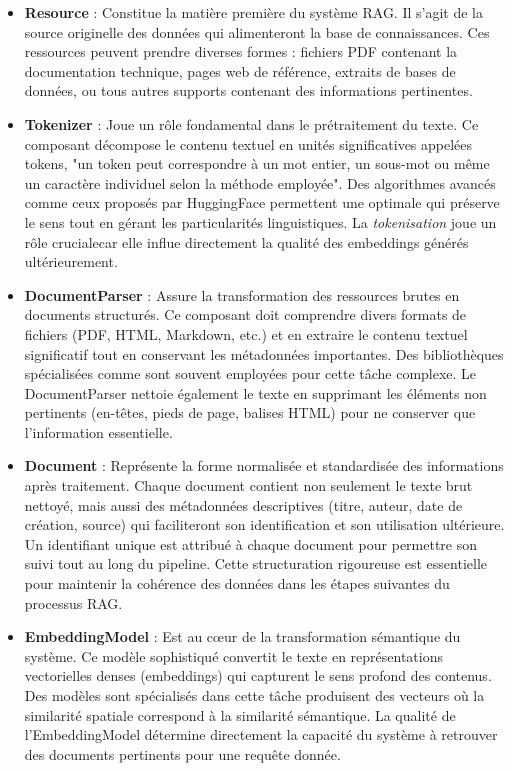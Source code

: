 \documentclass[12pt,a4paper]{report}
\begin{document}
	\begin{itemize}
		
		\item \textbf{Resource} : Constitue la matière première du système RAG. Il s'agit de la source originelle des données qui alimenteront la base de connaissances. Ces ressources peuvent prendre diverses formes : fichiers PDF contenant la documentation technique, pages web de référence, extraits de bases de données, ou tous autres supports contenant des informations pertinentes.
		
		\item \textbf{Tokenizer} : Joue un rôle fondamental dans le prétraitement du texte. Ce composant décompose le contenu textuel en unités significatives appelées tokens, "un token peut correspondre à un mot entier, un sous-mot ou même un caractère individuel selon la méthode employée". Des algorithmes avancés comme ceux proposés par HuggingFace permettent une  optimale qui préserve le sens tout en gérant les particularités linguistiques. La \textit{tokenisation} joue un rôle crucialecar elle influe directement la qualité des embeddings générés ultérieurement.
		
		\item \textbf{DocumentParser} : Assure la transformation des ressources brutes en documents structurés. Ce composant doit comprendre divers formats de fichiers (PDF, HTML, Markdown, etc.) et en extraire le contenu textuel significatif tout en conservant les métadonnées importantes. Des bibliothèques spécialisées comme sont souvent employées pour cette tâche complexe. Le DocumentParser nettoie également le texte en supprimant les éléments non pertinents (en-têtes, pieds de page, balises HTML) pour ne conserver que l'information essentielle.
		
		\item \textbf{Document} : Représente la forme normalisée et standardisée des informations après traitement. Chaque document contient non seulement le texte brut nettoyé, mais aussi des métadonnées descriptives (titre, auteur, date de création, source) qui faciliteront son identification et son utilisation ultérieure. Un identifiant unique est attribué à chaque document pour permettre son suivi tout au long du pipeline. Cette structuration rigoureuse est essentielle pour maintenir la cohérence des données dans les étapes suivantes du processus RAG.
		
		\item \textbf{EmbeddingModel} : Est au cœur de la transformation sémantique du système. Ce modèle sophistiqué convertit le texte en représentations vectorielles denses (embeddings) qui capturent le sens profond des contenus. Des modèles sont spécialisés dans cette tâche produisent des vecteurs où la similarité spatiale correspond à la similarité sémantique. La qualité de l'EmbeddingModel détermine directement la capacité du système à retrouver des documents pertinents pour une requête donnée.
		

\end{itemize}
\end{document}
